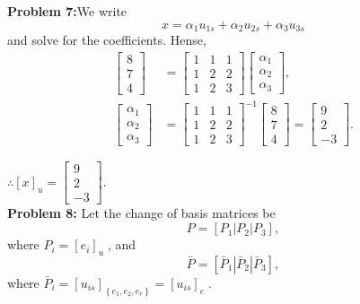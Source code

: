\documentclass[letterpaper]{article}
\begin{document}
\noindent \textbf{Problem 7:}We write
$$x=\alpha_1 u_{1s}+\alpha_2 u_{2s}+\alpha_3 u_{3s}$$
and solve for the coefficients. Hense,
$$\begin{aligned}\begin{bmatrix} 8\\7\\4 \end{bmatrix} &= \left[\begin{array}{ccc}1&1&1\\1&2&2\\1&2&3 \end{array}\right] \begin{bmatrix}\alpha_1\\\alpha_2\\\alpha_3 \end{bmatrix}, \\
\begin{bmatrix}\alpha_1\\\alpha_2\\\alpha_3 \end{bmatrix}&=\left[\begin{array}{ccc}1&1&1\\1&2&2\\1&2&3 \end{array}\right]^{-1}\begin{bmatrix} 8\\7\\4 \end{bmatrix}=\begin{bmatrix} 9\\2\\-3 \end{bmatrix}. \end{aligned}$$

$\therefore \left[x\right]_u=\begin{bmatrix} 9\\2\\-3 \end{bmatrix}$.
\bigskip \\

\noindent \textbf{Problem 8:} Let the change of basis matrices be
$$P = [P_1|P_2|P_3],$$ where $P_i=[e_i]_u\;$, and
$$\bar{P}=[\bar{P}_1|\bar{P}_2|\bar{P}_3],$$
where $\bar{P}_i = [u_{is}]_{\left\lbrace e_1, e_2, e_r\right\rbrace}=[u_{is}]_e\;$.\\
\end{document}
